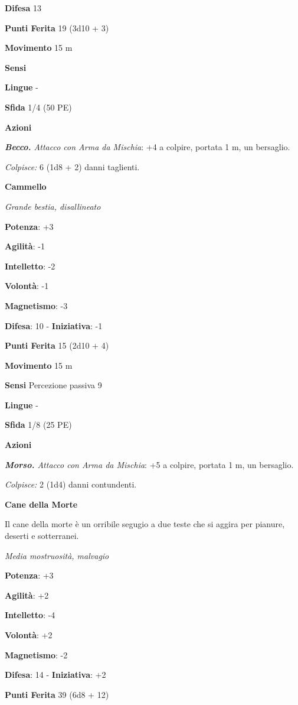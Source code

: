 \begin{multicols}{2}
\textbf{Difesa} 13

\textbf{Punti Ferita} 19 (3d10 + 3)

\textbf{Movimento} 15 m

\textbf{Sensi} 

\textbf{Lingue} -

\textbf{Sfida} 1/4 (50 PE)\smallskip

\smallskip\textbf{Azioni}

\emph{\textbf{Becco.} Attacco con Arma da Mischia}: +4 a colpire,
portata 1 m, un bersaglio.

\emph{Colpisce:} 6 (1d8 + 2) danni taglienti.

\textbf{Cammello}

\emph{Grande bestia, disallineato}

\textbf{Potenza}: +3

\textbf{Agilità}: -1

\textbf{Intelletto}: -2

\textbf{Volontà}: -1

\textbf{Magnetismo}: -3

\textbf{Difesa}: 10 - \textbf{Iniziativa}: -1

\textbf{Punti Ferita} 15 (2d10 + 4)

\textbf{Movimento} 15 m

\textbf{Sensi} Percezione passiva 9

\textbf{Lingue} -

\textbf{Sfida} 1/8 (25 PE)\smallskip

\smallskip\textbf{Azioni}

\emph{\textbf{Morso.} Attacco con Arma da Mischia}: +5 a colpire,
portata 1 m, un bersaglio.

\emph{Colpisce:} 2 (1d4) danni contundenti.

\textbf{Cane della Morte}

Il cane della morte è un orribile segugio a due teste che si aggira per
pianure, deserti e sotterranei.

\emph{Media mostruosità, malvagio}

\textbf{Potenza}: +3

\textbf{Agilità}: +2

\textbf{Intelletto}: -4

\textbf{Volontà}: +2

\textbf{Magnetismo}: -2

\textbf{Difesa}: 14 - \textbf{Iniziativa}: +2

\textbf{Punti Ferita} 39 (6d8 + 12)


\end{multicols}
